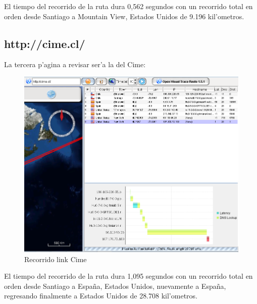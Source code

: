 \documentclass{article}
\begin{document}
El tiempo del recorrido de la ruta dura 0,562 segundos con un recorrido total en orden desde Santiago a Mountain View, Estados Unidos de 9.196 kil'ometros.
\newpage
\subsection{http://cime.cl/}
La tercera p'agina a revisar ser'a la del Cime:
\\
\begin{figure}[H]
  \centering
    \includegraphics[width=1.0\textwidth]{ruta1_cime}
  \caption{Recorrido link Cime}
  \label{cime}
\end{figure}

El tiempo del recorrido de la ruta dura 1,095 segundos con un recorrido total en orden desde Santiago a Espa\~na, Estados Unidos, nuevamente a Espa\~na, regresando finalmente a Estados Unidos de 28.708 kil'ometros.
\newpage
\end{document}
